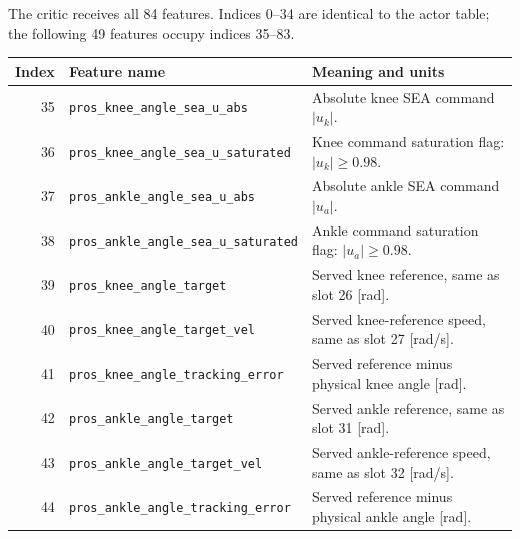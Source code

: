 The critic receives all 84 features. Indices 0--34 are identical to the actor table; the following 49 features occupy indices 35--83.

{\footnotesize
\begin{longtable}{@{}r p{7.2cm} p{7.5cm}@{}}
\toprule Index & Feature name & Meaning and units\\\midrule\endhead
35 & {\fontsize{7.6}{9.2}\selectfont\texttt{pros\_\allowbreak{}knee\_\allowbreak{}angle\_\allowbreak{}sea\_\allowbreak{}u\_\allowbreak{}abs}} & Absolute knee SEA command $|u_k|$.\\
36 & {\fontsize{7.6}{9.2}\selectfont\texttt{pros\_\allowbreak{}knee\_\allowbreak{}angle\_\allowbreak{}sea\_\allowbreak{}u\_\allowbreak{}saturated}} & Knee command saturation flag: $|u_k|\ge0.98$.\\
37 & {\fontsize{7.6}{9.2}\selectfont\texttt{pros\_\allowbreak{}ankle\_\allowbreak{}angle\_\allowbreak{}sea\_\allowbreak{}u\_\allowbreak{}abs}} & Absolute ankle SEA command $|u_a|$.\\
38 & {\fontsize{7.6}{9.2}\selectfont\texttt{pros\_\allowbreak{}ankle\_\allowbreak{}angle\_\allowbreak{}sea\_\allowbreak{}u\_\allowbreak{}saturated}} & Ankle command saturation flag: $|u_a|\ge0.98$.\\
39 & {\fontsize{7.6}{9.2}\selectfont\texttt{pros\_\allowbreak{}knee\_\allowbreak{}angle\_\allowbreak{}target}} & Served knee reference, same as slot 26 [rad].\\
40 & {\fontsize{7.6}{9.2}\selectfont\texttt{pros\_\allowbreak{}knee\_\allowbreak{}angle\_\allowbreak{}target\_\allowbreak{}vel}} & Served knee-reference speed, same as slot 27 [rad/s].\\
41 & {\fontsize{7.6}{9.2}\selectfont\texttt{pros\_\allowbreak{}knee\_\allowbreak{}angle\_\allowbreak{}tracking\_\allowbreak{}error}} & Served reference minus physical knee angle [rad].\\
42 & {\fontsize{7.6}{9.2}\selectfont\texttt{pros\_\allowbreak{}ankle\_\allowbreak{}angle\_\allowbreak{}target}} & Served ankle reference, same as slot 31 [rad].\\
43 & {\fontsize{7.6}{9.2}\selectfont\texttt{pros\_\allowbreak{}ankle\_\allowbreak{}angle\_\allowbreak{}target\_\allowbreak{}vel}} & Served ankle-reference speed, same as slot 32 [rad/s].\\
44 & {\fontsize{7.6}{9.2}\selectfont\texttt{pros\_\allowbreak{}ankle\_\allowbreak{}angle\_\allowbreak{}tracking\_\allowbreak{}error}} & Served reference minus physical ankle angle [rad].\\

\end{longtable}}
